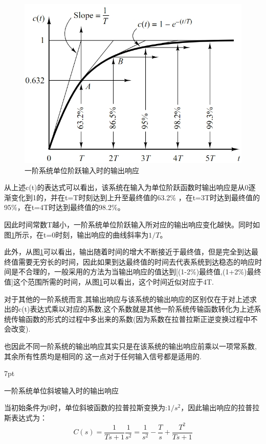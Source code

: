 \documentclass{article}
\numberwithin{equation}{section}
\numberwithin{figure}{section}
\newenvironment{formal}{%
\def\FrameCommand{%
\hspace{1pt}%
{\color{DarkBlue}\vrule width 2pt}%
{\color{formalshade}\vrule width 4pt}%
\colorbox{formalshade}%
}%
\MakeFramed{\advance\hsize-\width\FrameRestore}%
\noindent\hspace{-4.55pt}%
\begin{adjustwidth}{}{7pt}%
\vspace{2pt}\vspace{2pt}%
}
{%
\vspace{2pt}\end{adjustwidth}\endMakeFramed%
}
\begin{document}
    \begin{figure}
        \centering
        \includegraphics[width=.5\textwidth]{Chapter5/1orderunitstepresponse.png} %
        \caption{一阶系统单位阶跃输入时的输出响应} %
        \label{1orderunitstepresponse} %
    \end{figure}
    
    从上述c(t)的表达式可以看出，该系统在输入为单位阶跃函数时输出响应是从0逐渐变化到1的，并在t=T时刻达到上升至最终值的63.2\% ，在t=3T时达到最终值的95\%，在t=4T时达到最终值的98.2\%。

    因此时间常数T越小，一阶系统单位阶跃输入所对应的输出响应变化越快。同时如图\ref{1orderunitstepresponse}所示，在t=0时刻，输出响应的曲线斜率为$1/T$。

    此外，从图\ref{1orderunitstepresponse}可以看出，输出随着时间的增大不断接近于最终值，但是完全到达最终值需要无穷长的时间，因此如果到达最终值的时间去代表系统到达稳态的响应时间是不合理的，一般采用的方法为当输出响应的值达到[(1-2\%)最终值,(1+2\%)最终值]这个范围所需的时间，从图\ref{1orderunitstepresponse}可以看出，这个时间近似对应于4T.

    对于其他的一阶系统而言,其输出响应与该系统的输出响应的区别仅在于对上述求出的c(t)表达式乘以对应的系数,这个系数就是其他一阶系统传输函数转化为上述系统传输函数的形式的过程中多出来的系数(因为系数在拉普拉斯正逆变换过程中不会改变).

    也因此不同一阶系统的输出响应其实只是在该系统的输出响应前乘以一项常系数,其余所有性质均是相同的.这一点对于任何输入信号都是适用的.

\begin{formal}
    一阶系统单位斜坡输入时的输出响应
\end{formal}
当初始条件为0时，单位斜坡函数的拉普拉斯变换为:$1/s^2$，因此输出响应的拉普拉斯表达式为：
\begin{equation}
    C(s)=\frac{1}{Ts+1}\frac{1}{s^2}=\frac{1}{s^2}-\frac{T}{s}+\frac{T^2}{Ts+1}
\end{equation}
\end{document}
